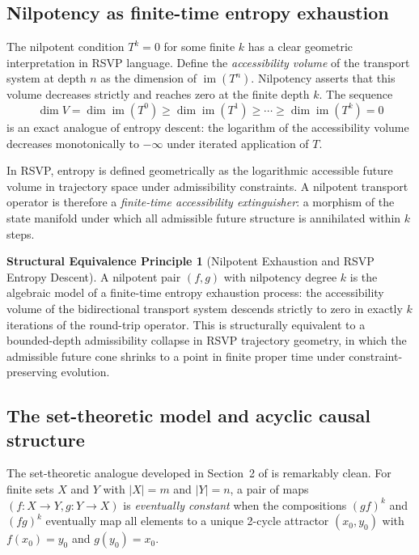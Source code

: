 \documentclass[12pt, a4paper]{article}
\theoremstyle{plain}
\theoremstyle{definition}
\theoremstyle{correspondence}
\newtheorem{strucprin}[theorem]{Structural Equivalence Principle}
\DeclareMathOperator{\im}{im}
\begin{document}
\subsection{Nilpotency as finite-time entropy exhaustion}

The nilpotent condition $T^k = 0$ for some finite $k$ has a clear geometric
interpretation in RSVP language. Define the \emph{accessibility volume} of the
transport system at depth $n$ as the dimension of $\im(T^n)$. Nilpotency asserts that
this volume decreases strictly and reaches zero at the finite depth $k$. The sequence
\[
\dim V = \dim \im(T^0) \geq \dim \im(T^1) \geq \cdots \geq \dim \im(T^k) = 0
\]
is an exact analogue of entropy descent: the logarithm of the accessibility volume
decreases monotonically to $-\infty$ under iterated application of $T$.

In RSVP, entropy is defined geometrically as the logarithmic accessible future volume
in trajectory space under admissibility constraints. A nilpotent transport operator is
therefore a \emph{finite-time accessibility extinguisher}: a morphism of the state
manifold under which all admissible future structure is annihilated within $k$ steps.

\begin{strucprin}[Nilpotent Exhaustion and RSVP Entropy Descent]
\label{sp:nilp}
A nilpotent pair $(f,g)$ with nilpotency degree $k$ is the algebraic model of a
finite-time entropy exhaustion process: the accessibility volume of the bidirectional
transport system descends strictly to zero in exactly $k$ iterations of the round-trip
operator. This is structurally equivalent to a bounded-depth admissibility collapse in
RSVP trajectory geometry, in which the admissible future cone shrinks to a point in
finite proper time under constraint-preserving evolution.
\end{strucprin}

\subsection{The set-theoretic model and acyclic causal structure}

The set-theoretic analogue developed in Section~2 of \cite{CIKLR25} is remarkably
clean. For finite sets $X$ and $Y$ with $|X| = m$ and $|Y| = n$, a pair of maps
$(f : X \to Y, g : Y \to X)$ is \emph{eventually constant} when the compositions $(gf)^k$
and $(fg)^k$ eventually map all elements to a unique 2-cycle attractor $(x_0, y_0)$
with $f(x_0) = y_0$ and $g(y_0) = x_0$.
\end{document}
